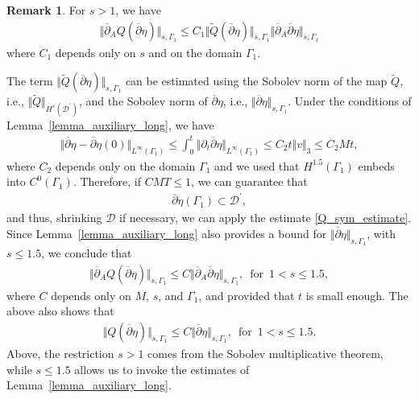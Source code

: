 \documentclass[10pt,reqno]{amsart}
\theoremstyle{plain}
\theoremstyle{definition}
\newtheorem{remark}[theorem]{Remark}
\numberwithin{equation}{section}
\newcommand{\cD}{\mathcal D}
\newcommand{\Ga}{\Gamma}
\newcommand{\norm}[1]{\Vert#1\Vert}
\begin{document}
\begin{remark}
For $s > 1$, we have 
\begin{gather}
\norm{\overline{\partial}_A Q(\overline{\partial} \eta)}_{s,\Ga_1} \leq C_1
\norm{\widetilde{Q}(\overline{\partial} \eta)}_{s,\Ga_1}
\norm{ \overline{\partial}_A \overline{\partial} \eta}_{s,\Ga_1}
\nonumber
\end{gather}
where $C_1$ depends only on $s$ and on the domain $\Ga_1$.

The term $\norm{ \widetilde{Q}(\overline{\partial} \eta)}_{s,\Ga_1}$
can be estimated using the Sobolev norm of the map $\widetilde{Q}$, i.e.,
 $\norm{\widetilde{Q}}_{H^s(\cD^\prime)}$, and the Sobolev norm of  $\overline{\partial} \eta$, i.e., 
$\norm{\overline{\partial} \eta}_{s,\Ga_1}$.
Under the conditions of Lemma~\ref{lemma_auxiliary_long}, we have 
\begin{gather}
\norm{ \overline{\partial} \eta - \overline{\partial} \eta (0)}_{L^\infty(\Ga_1)}
\leq \int_0^t \norm{\partial_t \overline{\partial} \eta }_{L^\infty(\Ga_1)}
\leq C_2 t \norm{v}_3 \leq C_2 Mt,
\nonumber
\end{gather}
where $C_2$ depends only on the domain $\Ga_1$ and we used that
$H^{1.5}(\Ga_1)$ embeds into $C^0(\Ga_1)$. 
Therefore, if $C M T \leq 1$,
we can guarantee that 
\begin{gather}
\overline{\partial}\eta(\Ga_1) \subset \cD^\prime,
\nonumber
\end{gather}
and thus, shrinking $\cD$ if necessary, we can 
apply the estimate \eqref{Q_sym_estimate}.
Since Lemma~\ref{lemma_auxiliary_long} also provides a bound for 
$\norm{\overline{\partial} \eta}_{s,\Ga_1}$, with $s \leq 1.5$, we conclude that 
\begin{gather}
\norm{\overline{\partial}_A Q(\overline{\partial} \eta)}_{s,\Ga_1} \leq C
\norm{ \overline{\partial}_A \overline{\partial} \eta}_{s,\Ga_1},
\, \text{ for } \, 1 < s \leq 1.5,
\label{rational_estimate}
\end{gather}
where $C$ depends only on $M$, $s$, and $\Ga_1$, and provided that $t$ is small
enough. The above also shows that 
\begin{gather}
\norm{ Q(\overline{\partial} \eta)}_{s,\Ga_1} \leq C
\norm{  \overline{\partial} \eta}_{s,\Ga_1},
\, \text{ for } \, 1 < s \leq 1.5
   .
\label{rational_estimate_2}
\end{gather}
Above, the restriction $s  > 1$ comes from the Sobolev multiplicative theorem, while
$s \leq 1.5$ allows us to invoke the estimates of Lemma~\ref{lemma_auxiliary_long}.
\end{remark}
\end{document}
